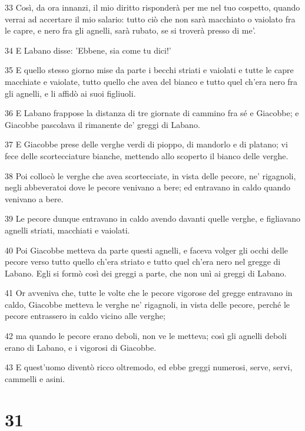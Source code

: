 \par 33 Così, da ora innanzi, il mio diritto risponderà per me nel tuo cospetto, quando verrai ad accertare il mio salario: tutto ciò che non sarà macchiato o vaiolato fra le capre, e nero fra gli agnelli, sarà rubato, se si troverà presso di me'.
\par 34 E Labano disse: 'Ebbene, sia come tu dici!'
\par 35 E quello stesso giorno mise da parte i becchi striati e vaiolati e tutte le capre macchiate e vaiolate, tutto quello che avea del bianco e tutto quel ch'era nero fra gli agnelli, e li affidò ai suoi figliuoli.
\par 36 E Labano frappose la distanza di tre giornate di cammino fra sé e Giacobbe; e Giacobbe pascolava il rimanente de' greggi di Labano.
\par 37 E Giacobbe prese delle verghe verdi di pioppo, di mandorlo e di platano; vi fece delle scortecciature bianche, mettendo allo scoperto il bianco delle verghe.
\par 38 Poi collocò le verghe che avea scortecciate, in vista delle pecore, ne' rigagnoli, negli abbeveratoi dove le pecore venivano a bere; ed entravano in caldo quando venivano a bere.
\par 39 Le pecore dunque entravano in caldo avendo davanti quelle verghe, e figliavano agnelli striati, macchiati e vaiolati.
\par 40 Poi Giacobbe metteva da parte questi agnelli, e faceva volger gli occhi delle pecore verso tutto quello ch'era striato e tutto quel ch'era nero nel gregge di Labano. Egli si formò così dei greggi a parte, che non unì ai greggi di Labano.
\par 41 Or avveniva che, tutte le volte che le pecore vigorose del gregge entravano in caldo, Giacobbe metteva le verghe ne' rigagnoli, in vista delle pecore, perché le pecore entrassero in caldo vicino alle verghe;
\par 42 ma quando le pecore erano deboli, non ve le metteva; così gli agnelli deboli erano di Labano, e i vigorosi di Giacobbe.
\par 43 E quest'uomo diventò ricco oltremodo, ed ebbe greggi numerosi, serve, servi, cammelli e asini.

\chapter{31}

